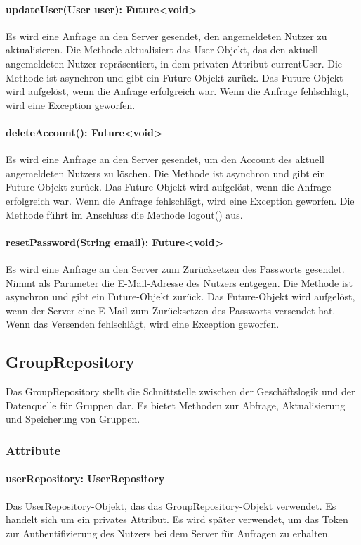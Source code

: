 \documentclass[parskip=full]{scrartcl}
\begin{document}
\paragraph{updateUser(User user): Future<void>}
Es wird eine Anfrage an den Server gesendet, den angemeldeten Nutzer zu aktualisieren. Die Methode aktualisiert das User-Objekt, das den aktuell angemeldeten Nutzer repräsentiert, in dem privaten Attribut currentUser.
Die Methode ist asynchron und gibt ein Future-Objekt zurück. Das Future-Objekt wird aufgelöst, wenn die Anfrage erfolgreich war. Wenn die Anfrage fehlschlägt, wird eine Exception geworfen.
\paragraph{deleteAccount(): Future<void>}
Es wird eine Anfrage an den Server gesendet, um den Account des aktuell angemeldeten Nutzers zu löschen. Die Methode ist asynchron und gibt ein Future-Objekt zurück. Das Future-Objekt wird aufgelöst, wenn die Anfrage erfolgreich war. Wenn die Anfrage fehlschlägt, wird eine Exception geworfen. Die Methode führt im Anschluss die Methode logout() aus.
\paragraph{resetPassword(String email): Future<void>}
Es wird eine Anfrage an den Server zum Zurücksetzen des Passworts gesendet. Nimmt als Parameter die E-Mail-Adresse des Nutzers entgegen. Die Methode ist asynchron und gibt ein Future-Objekt zurück. Das Future-Objekt wird aufgelöst, wenn der Server eine E-Mail zum Zurücksetzen des Passworts versendet hat. Wenn das Versenden fehlschlägt, wird eine Exception geworfen.

\newpage
\subsection{GroupRepository}
Das GroupRepository stellt die Schnittstelle zwischen der Geschäftslogik und der Datenquelle für Gruppen dar. Es bietet Methoden zur Abfrage, Aktualisierung und Speicherung von Gruppen.
\subsubsection*{Attribute}
\paragraph{userRepository: UserRepository}
Das UserRepository-Objekt, das das GroupRepository-Objekt verwendet. Es handelt sich um ein privates Attribut. Es wird später verwendet, um das Token zur Authentifizierung des Nutzers bei dem Server für Anfragen zu erhalten.
\end{document}
